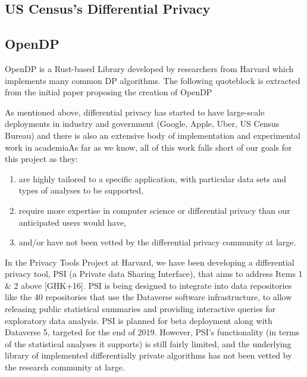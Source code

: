 \subsection{US Census's Differential Privacy}

\subsection{OpenDP}
OpenDP is a Rust-based Library developed by researchers from Harvard which implements many common DP algorithms. The following quoteblock is extracted from the initial paper proposing the creation of OpenDP \cite{Vadhan2019OpenDPA}
\begin{displayquote}
As mentioned above, differential privacy has started to have large-scale deployments in industry and government (Google, Apple, Uber, US Census Bureau) and there is also an extensive body of implementation and experimental work in academiaAs far as we know, all of this work falls short of our goals for this project as they:
\begin{enumerate}
    \item are highly tailored to a specific application, with particular data sets and types of analyses to be supported,
    \item require more expertise in computer science or differential privacy than our anticipated users would have,
    \item and/or have not been vetted by the differential privacy community at large.
\end{enumerate}
In the Privacy Tools Project at Harvard, we have been developing a differential privacy tool, PSI (a Private data Sharing Interface), that aims to address Items 1 \& 2 above [GHK+16]. PSI is being designed to integrate into data repositories like the 40 repositories that use the Dataverse software infrastructure, to allow releasing public statistical summaries and providing interactive queries for exploratory data analysis. PSI is planned for beta deployment along with Dataverse 5, targeted for the end of 2019. However, PSI’s functionality (in terms of the statistical analyses it supports) is still fairly limited, and the underlying library of implemented differentially private algorithms has not been vetted by the research community at large.


\end{displayquote}
